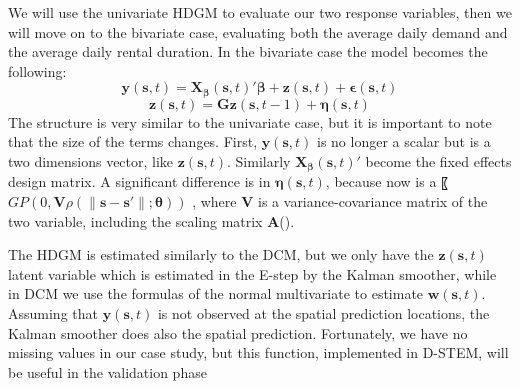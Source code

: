 We will use the univariate HDGM to evaluate our two response variables, then we will move on to the bivariate case, evaluating both the average daily demand and the average daily rental duration. In the bivariate case the model becomes the following:
\begin{displaymath}{\pmb{y}(\pmb{s},t)=\pmb{X_\beta}(\pmb{s},t)'\pmb{\beta}+\pmb{z}(\pmb{s},t)+\pmb{\epsilon}(\pmb{s},t)}\end{displaymath}
\begin{displaymath}{\pmb{z}(\pmb{s},t)=\pmb{Gz}(\pmb{s},t-1)+\pmb{\eta}(\pmb{s},t)}\end{displaymath}
The structure is very similar to the univariate case, but it is important to note that the size of the terms changes. First, $\pmb{y}(\pmb{s},t)$ is no longer a scalar but is a two dimensions vector, like $\pmb{z}(\pmb{s},t)$. Similarly $\pmb{X_\beta}(\pmb{s},t)'$ become the fixed effects design matrix. A significant difference is in $\pmb{\eta}(\pmb{s},t)$, because now is a 〖$GP(0,\pmb{V}\rho(\lVert \pmb{s}-\pmb{s'} \rVert;\pmb{\theta}))$ , where $\pmb{V}$ is a variance-covariance matrix of the two variable, including the scaling matrix $\pmb{A}$(\cite{hdgm}).

The HDGM is estimated similarly to the DCM, but we only have the $\pmb{z}(\pmb{s},t)$ latent variable which is estimated in the E-step by the Kalman smoother, while in DCM we use the formulas of the normal multivariate to estimate $\pmb{w}(\pmb{s},t)$. Assuming that $\pmb{y}(\pmb{s},t)$ is not observed at the spatial prediction locations, the Kalman smoother does also the spatial prediction. Fortunately, we have no missing values in our case study, but this function, implemented in D-STEM, will be useful in the validation phase